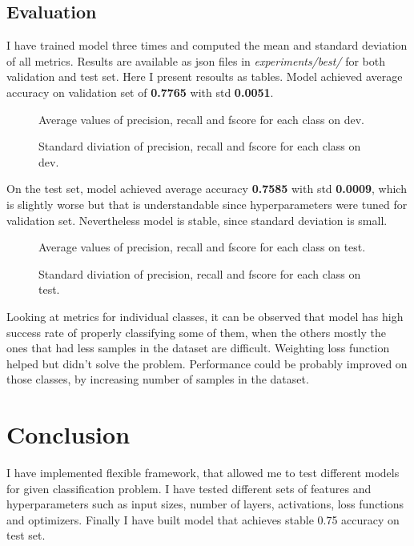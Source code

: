 \documentclass{article}
\begin{document}
\newpage

\subsection{Evaluation}
I have trained model three times and computed the mean and standard deviation of all metrics.
Results are available as json files in \textit{experiments/best/} for both validation and test set.
Here I present resoults as tables. Model achieved average accuracy on validation set of \textbf{0.7765} with std \textbf{0.0051}.

\begin{figure}[h]
	\centering
	\begin{minipage}{0.45\textwidth}
		\scalebox{0.7}{}
        \caption{Average values of precision, recall and fscore for each class on dev.}
	\end{minipage}
	\hfill
	\begin{minipage}{0.45\textwidth}
		\scalebox{0.7}{}
        \caption{Standard diviation of precision, recall and fscore for each class on dev.}
	\end{minipage}
\end{figure}

On the test set, model achieved average accuracy \textbf{0.7585} with std \textbf{0.0009}, which is
slightly worse but that is
understandable since hyperparameters were tuned for validation set. Nevertheless model is stable,
since standard deviation is small.

\begin{figure}[h]
	\centering
	\begin{minipage}{0.45\textwidth}
		\scalebox{0.7}{}
        \caption{Average values of precision, recall and fscore for each class on test.}
	\end{minipage}
	\hfill
	\begin{minipage}{0.45\textwidth}
		\scalebox{0.7}{}
        \caption{Standard diviation of precision, recall and fscore for each class on test.}
	\end{minipage}
\end{figure}

Looking at metrics for individual classes, it can be observed that model has high success rate of
properly classifying some of them, when the others mostly the ones that had less samples in the dataset are
difficult. Weighting loss function helped but didn't solve the problem.
Performance could be probably improved on those classes, by increasing number of samples in
the dataset.

\section{Conclusion}
I have implemented flexible framework, that allowed me to test different models for given classification problem.
I have tested different sets of features and hyperparameters such as input sizes, number of layers, activations, 
loss functions and optimizers. Finally I have built model that achieves stable 0.75 accuracy on test set.
\end{document}
